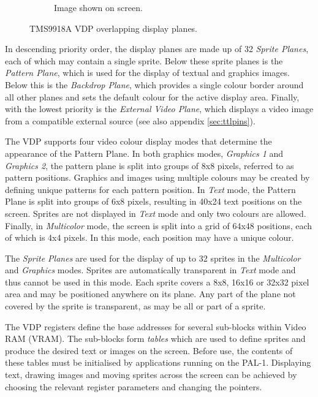 \documentclass[a4paper,11pt,twoside,openright]{report}
\begin{document}
\begin{figure}[h!]
\begin{subfigure}[b]{0.4\textwidth}
{
		}
		\caption{Image shown on screen.}
	\end{subfigure}
    \caption[TMS9918A VDP display planes]{TMS9918A VDP overlapping display planes.}
	\label{fig:planes}
\end{figure}

In descending priority order, the display planes are made up of 32 \textit{Sprite Planes}, each of which may contain a single sprite. Below these sprite planes is the \textit{Pattern Plane}, which is used for the display of textual and graphics images. Below this is the \textit{Backdrop Plane}, which provides a single colour border around all other planes and sets the default colour for the active display area. Finally, with the lowest priority is the \textit{External Video Plane}, which displays a video image from a compatible external source (see also appendix \ref{sec:ttlpins}).

The VDP supports four video colour display modes that determine the appearance of the Pattern Plane. In both graphics modes, \textit{Graphics 1} and \textit{Graphics 2}, the pattern plane is split into groups of 8x8 pixels, referred to as pattern positions. Graphics and images using multiple colours may be created by defining unique patterns for each pattern position. In \textit{Text} mode, the Pattern Plane is split into groups of 6x8 pixels, resulting in 40x24 text positions on the screen. Sprites are not displayed in \textit{Text} mode and only two colours are allowed. Finally, in \textit{Multicolor} mode, the screen is split into a grid of 64x48 positions, each of which is 4x4 pixels. In this mode, each position may have a unique colour.

The \textit{Sprite Planes} are used for the display of up to 32 sprites in the \textit{Multicolor} and \textit{Graphics} modes. Sprites are automatically transparent in \textit{Text} mode and thus cannot be used in this mode. Each sprite covers a 8x8, 16x16 or 32x32 pixel area and may be positioned anywhere on its plane. Any part of the plane not covered by the sprite is transparent, as may be all or part of a sprite.

The VDP registers define the base addresses for several sub-blocks within Video RAM (VRAM). The sub-blocks form \textit{tables} which are used to define sprites and produce the desired text or images on the screen. Before use, the contents of these tables must be initialised by applications running on the PAL-1. Displaying text, drawing images and moving sprites across the screen can be achieved by choosing the relevant register parameters and changing the pointers.
\end{document}

